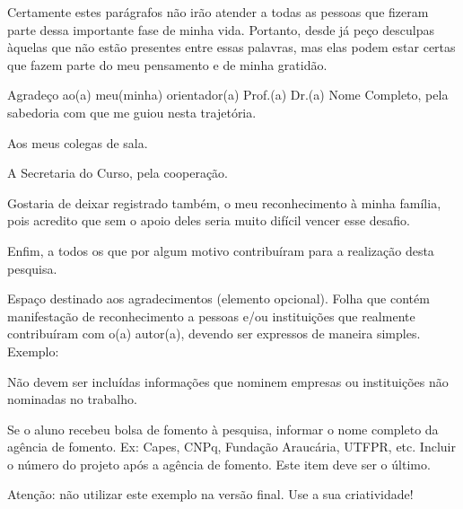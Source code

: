 
\begin{agradecimentos}%

Certamente estes parágrafos não irão atender a todas as pessoas que fizeram parte dessa importante fase de minha vida. Portanto, desde já peço desculpas àquelas que não estão presentes entre essas palavras, mas elas podem estar certas que fazem parte do meu pensamento e de minha gratidão. 

Agradeço ao(a) meu(minha) orientador(a) Prof.(a) Dr.(a) Nome Completo, pela sabedoria com que me guiou nesta trajetória.

Aos meus colegas de sala.

A Secretaria do Curso, pela cooperação.

Gostaria de deixar registrado também, o meu reconhecimento à minha família, pois acredito que sem o apoio deles seria muito difícil vencer esse desafio. 

Enfim, a todos os que por algum motivo contribuíram para a realização desta pesquisa.


Espaço destinado aos agradecimentos (elemento opcional). Folha que contém manifestação de reconhecimento a pessoas e/ou instituições que realmente contribuíram com o(a) autor(a), devendo ser expressos de maneira simples. Exemplo:

Não devem ser incluídas informações que nominem empresas ou instituições não nominadas no trabalho.

Se o aluno recebeu bolsa de fomento à pesquisa, informar o nome completo da agência de fomento. Ex: Capes, CNPq, Fundação Araucária, UTFPR, etc. Incluir o número do projeto após a agência de fomento. Este item deve ser o último.

Atenção: não utilizar este exemplo na versão final. Use a sua criatividade!

\end{agradecimentos}
